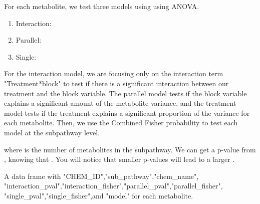\documentclass[a4paper]{book}
\begin{document}
%
\begin{Details}
For each metabolite, we test three models using using ANOVA.
\begin{enumerate}


\item{} Interaction:  

\item{} Parallel: 

\item{} Single: 


\end{enumerate}


For the interaction model, we are focusing only on the interaction term
"Treatment*block" to test if there is a significant interaction between our
treatment and the block variable. The parallel model tests if the block
variable explains a significant amount of the metabolite variance, and the
treatment model tests if the treatment explains a significant proportion of
the variance for each metabolite. Then, we use the Combined Fisher
probability to test each model at the subpathway level.


where  is the number of metabolites in the subpathway. We can
get a p-value from , knowing that
. You will notice that smaller p-values will
lead to a larger .
\end{Details}
%
\begin{Value}
A data frame with "CHEM\_ID","sub\_pathway","chem\_name",
"interaction\_pval","interaction\_fisher","parallel\_pval","parallel\_fisher",
"single\_pval","single\_fisher",and "model" for each metabolite.
\end{Value}
%
\begin{SeeAlso}
\end{SeeAlso}
%
\end{document}
